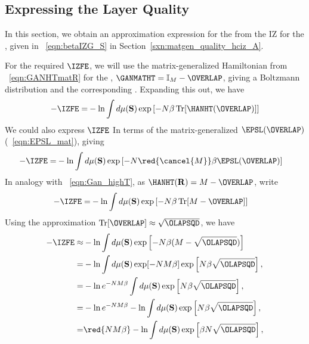 \subsection{Expressing the Layer Quality}
\label{sxn:quality}

In this section, we obtain an approximation expression for the \LayerQualitySquared from the IZ \FreeEnergy for the \GeneralizationError, 
given in \EQN~\ref{eqn:betaIZG_S} in Section~\ref{sxn:matgen_quality_hciz_A}.

For the required \FreeEnergy $\IZFE$, we will use the matrix-generalized Hamiltonian
from \EQN~\ref{eqn:GANHTmatR} for the
\LayerQuality, $\GANMATHT=\mathbb{I}_{M}-\OVERLAP$,
giving a  Boltzmann distribution and the corresponding \ThermalAverage.  
Expanding this out, we have
\begin{align}
  \label{eqn:IZFE0}
  -\IZFE =& -  \ln \int d\mu(\mathbf{S}) \exp\left[-N\beta \operatorname{Tr}[\HANHT(\OVERLAP)]  \right] \\
\end{align}
We could also express $\IZFE$ In terms of the matrix-generalized \EffectivePotential $\EPSL(\OVERLAP)$
(\EQN~\ref{eqn:EPSL_mat}), giving
\begin{align}
  -\IZFE =& -  \ln \int d\mu(\mathbf{S}) \exp\left[-N\red{\cancel{M}}\beta \EPSL(\OVERLAP)  \right] 
\end{align}
In analogy with \EQN~\ref{eqn:Gan_highT}, 
as $\HANHT(\mathbf{R})=M-\OVERLAP$,  write
\begin{align}
-\IZFE  =& -  \ln \int d\mu(\mathbf{S}) \exp\left[-N\beta \operatorname{Tr}[M-\OVERLAP]  \right] 
\end{align}
Using the approximation $\operatorname{Tr}[\OVERLAP]\approx\sqrt{\OLAPSQD}$, we have
\begin{align}
  -\IZFE 
\approx& - \ln \int d\mu(\mathbf{S}) \exp\left[-N\beta(M-\sqrt{\OLAPSQD} ) \right] \\ 
\label{eqn:IZFE1}
=& -  \ln \int d\mu(\mathbf{S}) \exp[-NM\beta]\exp\left[N\beta\sqrt{\OLAPSQD}\right], \\
\label{eqn:IZFE2}
=& -  \ln e^{-NM\beta} \int d\mu(\mathbf{S}) \exp\left[N\beta\sqrt{\OLAPSQD}\right], \\
\label{eqn:IZFE3}
=& -  \ln e^{-NM\beta} - \ln \int d\mu(\mathbf{S}) \exp\left[N\beta\sqrt{\OLAPSQD}\right], \\
\label{eqn:IZFE4}
=& \red{NM\beta} - \ln \int d\mu(\mathbf{S}) \exp\left[\beta N\sqrt{\OLAPSQD}\right], 
\end{align}

